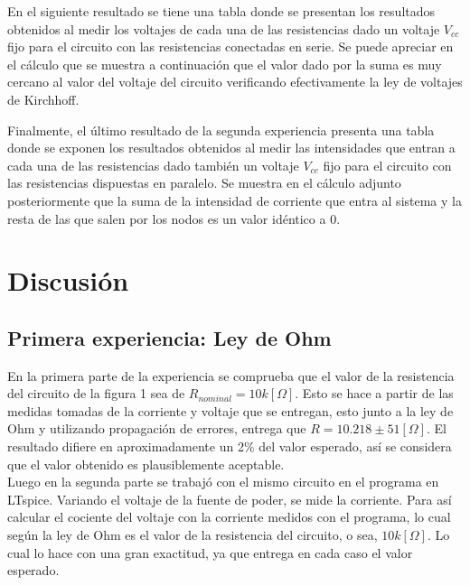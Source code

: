 \documentclass[letterpaper,11pt]{article} %
\begin{document}
En el siguiente resultado se tiene una tabla donde se presentan los resultados obtenidos al medir los voltajes de cada una de las resistencias dado un voltaje $V_{cc}$ fijo para el circuito con las resistencias conectadas en serie. Se puede apreciar en el cálculo que se muestra a continuación que el valor dado por la suma es muy cercano al valor del voltaje del circuito verificando efectivamente la ley de voltajes de Kirchhoff. %

Finalmente, el último resultado de la segunda experiencia presenta una tabla donde se exponen los resultados obtenidos al medir las intensidades que entran a cada una de las resistencias dado también un voltaje $V_{cc}$ fijo para el circuito con las resistencias dispuestas en paralelo. Se muestra en el cálculo adjunto posteriormente que la suma de la intensidad de corriente que entra al sistema y la resta de las que salen por los nodos es un valor idéntico a $0$. %



\newpage
\section{Discusión}
\subsection{Primera experiencia: Ley de Ohm}
En la primera parte de la experiencia se comprueba que el valor de la resistencia del circuito de la figura 1 sea de $R_{nominal}=10k [\Omega]$. Esto se hace a partir de las medidas tomadas de la corriente y voltaje que se entregan, esto junto a la ley de Ohm y utilizando propagación de errores, entrega que $R=10.218\pm 51[\Omega]$. El resultado difiere en aproximadamente un 2\% del valor esperado, así se considera que el valor obtenido es plausiblemente aceptable.\\

Luego en la segunda parte se trabajó con el mismo circuito en el programa en LTspice. Variando el voltaje de la fuente de poder, se mide la corriente. Para así calcular el cociente del voltaje con la corriente medidos con el programa, lo cual según la ley de Ohm es el valor de la resistencia del circuito, o sea, $10k[\Omega]$. Lo cual lo hace con una gran exactitud, ya que entrega en cada caso el valor esperado.\\
\end{document}
